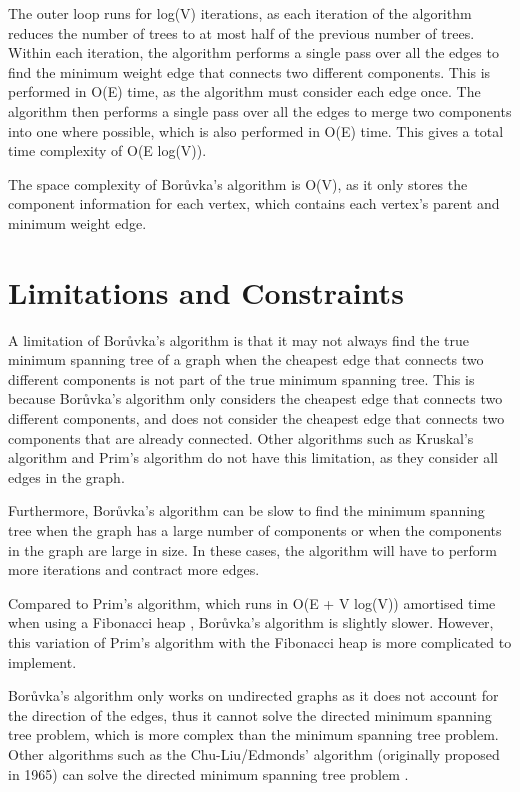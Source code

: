 \documentclass[a4paper, 11pt]{article}
\begin{document}
The outer loop runs for log(V) iterations, as each iteration of the algorithm reduces the number of trees to at most half of the previous number of trees. Within each iteration, the algorithm performs a single pass over all the edges to find the minimum weight edge that connects two different components. This is performed in O(E) time, as the algorithm must consider each edge once. The algorithm then performs a single pass over all the edges to merge two components into one where possible, which is also performed in O(E) time. This gives a total time complexity of O(E log(V)).

The space complexity of Borůvka's algorithm is O(V), as it only stores the component information for each vertex, which contains each vertex's parent and minimum weight edge.

\section{Limitations and Constraints}
A limitation of Borůvka's algorithm is that it may not always find the true minimum spanning tree of a graph when the cheapest edge that connects two different components is not part of the true minimum spanning tree. This is because Borůvka's algorithm only considers the cheapest edge that connects two different components, and does not consider the cheapest edge that connects two components that are already connected. Other algorithms such as Kruskal's algorithm and Prim's algorithm do not have this limitation, as they consider all edges in the graph.

Furthermore, Borůvka's algorithm can be slow to find the minimum spanning tree when the graph has a large number of components or when the components in the graph are large in size. In these cases, the algorithm will have to perform more iterations and contract more edges.

Compared to Prim's algorithm, which runs in O(E + V log(V)) amortised time when using a Fibonacci heap \cite{fredman1987fibonacci}, Borůvka's algorithm is slightly slower. However, this variation of Prim's algorithm with the Fibonacci heap is more complicated to implement.

Borůvka's algorithm only works on undirected graphs as it does not account for the direction of the edges, thus it cannot solve the directed minimum spanning tree problem, which is more complex than the minimum spanning tree problem. Other algorithms such as the Chu-Liu/Edmonds' algorithm (originally proposed in 1965) can solve the directed minimum spanning tree problem \cite{gabow1986efficient}.
\end{document}
